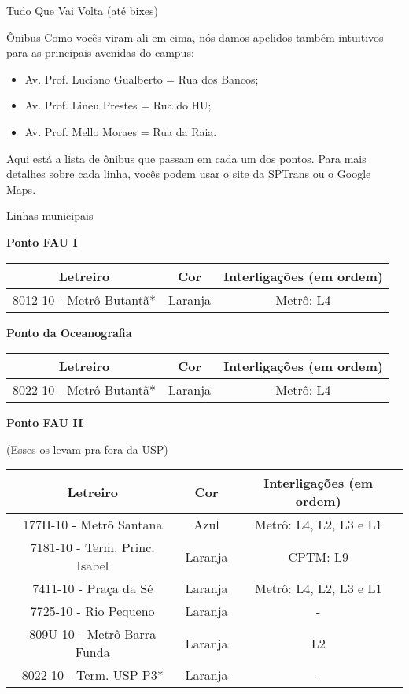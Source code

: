 \begin{secao}{Tudo Que Vai Volta (até bixes)}
\begin{subsecao}{Ônibus}
Como vocês viram ali em cima, nós damos apelidos também intuitivos para as
principais avenidas do campus:
\begin{itemize}
	\item Av. Prof. Luciano Gualberto = Rua dos Bancos;
	\item Av. Prof. Lineu Prestes = Rua do HU;
	\item Av. Prof. Mello Moraes = Rua da Raia.
\end{itemize}

Aqui está a lista de ônibus que passam em cada um dos pontos. Para mais detalhes
sobre cada linha, vocês podem usar o site da SPTrans ou o Google Maps.

\begin{subsubsecao}{Linhas municipais}

{\bf Ponto FAU I}

\begin{center}
	\begin{tabular}{|c|c|c|}
      \hline
	  Letreiro & Cor & Interligações (em ordem)\\
	  \hline
	  8012-10 - Metrô Butantã* & Laranja & Metrô: L4\\
      \hline
	\end{tabular}
\end{center}

{\bf Ponto da Oceanografia}

\begin{center}
	\begin{tabular}{|c|c|c|}
      \hline
	  Letreiro & Cor & Interligações (em ordem)\\
	  \hline
	  8022-10 - Metrô Butantã* & Laranja & Metrô: L4\\
      \hline
	\end{tabular}
\end{center}

{\bf Ponto FAU II}

(Esses os levam pra fora da USP)
\begin{center}
	\begin{tabular}{|c|c|c|}
      \hline
	  Letreiro & Cor & Interligações (em ordem)\\
	  \hline
	  177H-10 - Metrô Santana & Azul & Metrô: L4, L2, L3 e L1\\
	  7181-10 - Term. Princ. Isabel & Laranja & CPTM: L9\\
	  7411-10 - Praça da Sé & Laranja & Metrô: L4, L2, L3 e L1\\
	  7725-10 - Rio Pequeno & Laranja & - \\
	  809U-10 - Metrô Barra Funda & Laranja & L2 \\
	  8022-10 - Term. USP P3* & Laranja & -\\
      \hline
	\end{tabular}
\end{center}


\end{subsubsecao}
\end{subsecao}
\end{secao}
